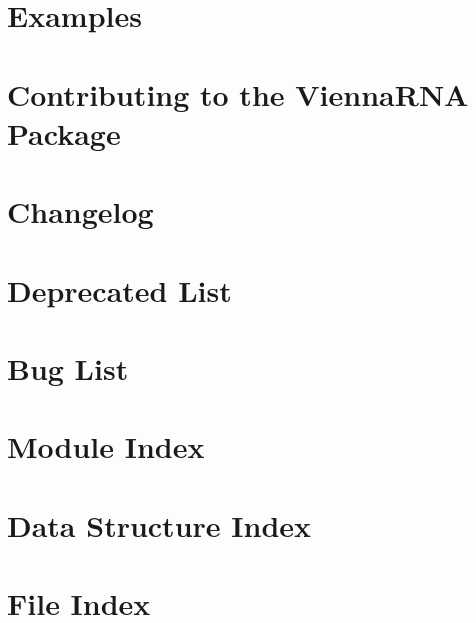 \documentclass[twoside]{book}
\newcommand{\+}{\discretionary{\mbox{\scriptsize$\hookleftarrow$}}{}{}}
\begin{document}
\chapter{Examples}
\label{examples}

\chapter{Contributing to the Vienna\+RNA Package}
\label{md_CONTRIBUTING}

\chapter{Changelog}
\label{md_CHANGELOG}

\chapter{Deprecated List}
\label{deprecated}

\chapter{Bug List}
\label{bug}

\chapter{Module Index}

\chapter{Data Structure Index}

\chapter{File Index}

\end{document}

